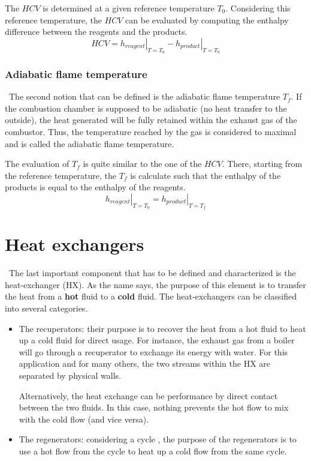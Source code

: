 The $HCV$ is determined at a given reference temperature $T_0$. Considering this reference temperature, the $HCV$ can be evaluated by computing the enthalpy difference between the reagents and the products. 
\begin{equation}
HCV = \left.h_{reagent}\right|_{T=T_0} - \left.h_{product}\right|_{T=T_0}\label{eq:C3_HCV2}
\end{equation}
\subsubsection{Adiabatic flame temperature}
\quad\, The second notion that can be defined is the adiabatic flame temperature $T_f$. If the combustion chamber is supposed to be adiabatic (no heat transfer to the outside), the heat generated will be fully retained within the exhaust gas of the combustor. Thus, the temperature reached by the gas is considered to maximal and is called the adiabatic flame temperature.

The evaluation of $T_f$ is quite similar to the one of the $HCV$. There, starting from the reference temperature, the $T_f$ is calculate such that the enthalpy of the products is equal to the enthalpy of the reagents.
\begin{equation}
\left.h_{reagent}\right|_{T=T_0} = \left.h_{product}\right|_{T=T_f}\label{eq:C3_T_f}
\end{equation}

\newpage
\section{Heat exchangers}
\quad\, The last important component that has to be defined and characterized is the heat-exchanger (HX). As the name says, the purpose of this element is to transfer the heat from a \textbf{hot} fluid to a \textbf{cold} fluid. The heat-exchangers can be classified into several categories\citep{Ngendakumana2018}.

\begin{itemize}
\item The recuperators: their purpose is to recover the heat from a hot fluid to heat up a cold fluid for direct usage. For instance, the exhaust gas from a boiler will go through a recuperator to exchange its energy with water. For this application and for many others, the two streams within the HX are separated by physical walls.

Alternatively, the heat exchange can be performance by direct contact between the two fluids. In this case, nothing prevents the hot flow to mix with the cold flow (and vice versa).
\item The regenerators: considering a cycle , the purpose of the regenerators is to use a hot flow from the cycle to heat up a cold flow from the same cycle. 
\end{itemize}

